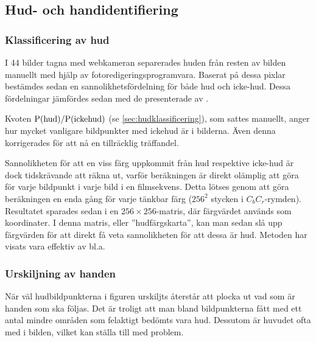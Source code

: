 \subsection{Hud- och handidentifiering}

\subsubsection{Klassificering av hud}
I 44 bilder tagna med webkameran separerades huden från resten av
bilden manuellt med hjälp av fotoredigeringsprogramvara. Baserat på
dessa pixlar bestämdes sedan en sannolikhetsfördelning för både hud
och icke-hud. Dessa fördelningar jämfördes sedan med de presenterade
av .

Kvoten $\mathrm{P}(\textrm{hud})/\mathrm{P}(\textrm{ickehud})$ (se
\ref{sec:hudklassificering}), som sattes
manuellt, anger hur mycket vanligare bildpunkter med ickehud är i
bilderna. Även denna korrigerades för att nå en tillräcklig träffandel.

Sannolikheten för att en viss färg uppkommit från hud respektive
icke-hud är dock tidskrävande att räkna ut, varför beräkningen
är direkt olämplig att göra för varje bildpunkt i varje bild i en
filmsekvens. Detta lötses genom att göra beräkningen en enda gång för
varje tänkbar färg ($256^2$ stycken i $C_bC_r$-rymden). Resultatet sparades
sedan i en $256\times256$-matris, där färgvärdet används som koordinater.
I denna matris, eller ''hudfärgskarta'', kan man sedan slå upp
färgvärden för att direkt få veta sannolikheten för att dessa är
hud. Metoden har visats vara effektiv av bl.a.~

\subsubsection{Urskiljning av handen}\label{sec:metod_hud:urskiljning}

När väl hudbildpunkterna i figuren urskiljts återstår att plocka ut
vad som är handen som ska följas. Det är troligt att man bland
bildpunkterna fått med ett antal mindre områden som felaktigt bedömts vara
hud. Dessutom är huvudet ofta med i bilden, vilket kan ställa till med
problem. 


